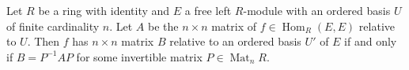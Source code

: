 Let $R$ be a ring with identity and $E$ a free left $R$-module with an ordered basis $U$ of finite cardinality $n$. Let $A$ be the $n \times n$ matrix of $f \in \operatorname{Hom}_R(E,E)$ relative to $U$. Then $f$ has $n \times n$ matrix $B$ relative to an ordered basis $U'$ of $E$ if and only if $B = P^{-1}AP$ for some invertible matrix $P \in \operatorname{Mat}_n R$.
